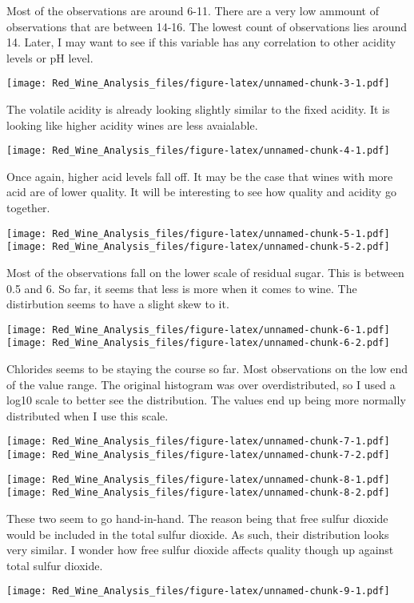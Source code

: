 \documentclass[]{article}
\begin{document}
Most of the observations are around 6-11. There are a very low ammount
of observations that are between 14-16. The lowest count of observations
lies around 14. Later, I may want to see if this variable has any
correlation to other acidity levels or pH level.

\texttt{[image: Red\_Wine\_Analysis\_files/figure-latex/unnamed-chunk-3-1.pdf]}

The volatile acidity is already looking slightly similar to the fixed
acidity. It is looking like higher acidity wines are less avaialable.

\texttt{[image: Red\_Wine\_Analysis\_files/figure-latex/unnamed-chunk-4-1.pdf]}

Once again, higher acid levels fall off. It may be the case that wines
with more acid are of lower quality. It will be interesting to see how
quality and acidity go together.

\texttt{[image: Red\_Wine\_Analysis\_files/figure-latex/unnamed-chunk-5-1.pdf]}
\texttt{[image: Red\_Wine\_Analysis\_files/figure-latex/unnamed-chunk-5-2.pdf]}

Most of the observations fall on the lower scale of residual sugar. This
is between 0.5 and 6. So far, it seems that less is more when it comes
to wine. The distirbution seems to have a slight skew to it.

\texttt{[image: Red\_Wine\_Analysis\_files/figure-latex/unnamed-chunk-6-1.pdf]}
\texttt{[image: Red\_Wine\_Analysis\_files/figure-latex/unnamed-chunk-6-2.pdf]}

Chlorides seems to be staying the course so far. Most observations on
the low end of the value range. The original histogram was over
overdistributed, so I used a log10 scale to better see the distribution.
The values end up being more normally distributed when I use this scale.

\texttt{[image: Red\_Wine\_Analysis\_files/figure-latex/unnamed-chunk-7-1.pdf]}
\texttt{[image: Red\_Wine\_Analysis\_files/figure-latex/unnamed-chunk-7-2.pdf]}

\texttt{[image: Red\_Wine\_Analysis\_files/figure-latex/unnamed-chunk-8-1.pdf]}
\texttt{[image: Red\_Wine\_Analysis\_files/figure-latex/unnamed-chunk-8-2.pdf]}

These two seem to go hand-in-hand. The reason being that free sulfur
dioxide would be included in the total sulfur dioxide. As such, their
distribution looks very similar. I wonder how free sulfur dioxide
affects quality though up against total sulfur dioxide.

\texttt{[image: Red\_Wine\_Analysis\_files/figure-latex/unnamed-chunk-9-1.pdf]}
\end{document}
